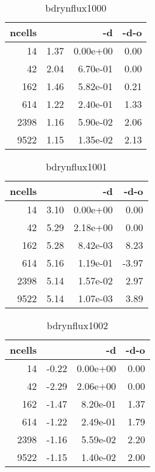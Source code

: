 \documentclass[11pt]{article}
\begin{document}
%
%
\begin{table}[!htbp]
\begin{center}
\begin{tabular}{r||r|r|r}
ncells           &                  & -d               & -d-o            \\\hline\hline
             14&      1.37&  0.00e+00&    0.00\\\hline
             42&      2.04&  6.70e-01&    0.00\\\hline
            162&      1.46&  5.82e-01&    0.21\\\hline
            614&      1.22&  2.40e-01&    1.33\\\hline
           2398&      1.16&  5.90e-02&    2.06\\\hline
           9522&      1.15&  1.35e-02&    2.13\\\hline
\end{tabular}
\caption{bdrynflux1000}
\end{center}
\label{tab:bdrynflux1000}
\end{table}
%
%
\begin{table}[!htbp]
\begin{center}
\begin{tabular}{r||r|r|r}
ncells           &                  & -d               & -d-o            \\\hline\hline
             14&      3.10&  0.00e+00&    0.00\\\hline
             42&      5.29&  2.18e+00&    0.00\\\hline
            162&      5.28&  8.42e-03&    8.23\\\hline
            614&      5.16&  1.19e-01&   -3.97\\\hline
           2398&      5.14&  1.57e-02&    2.97\\\hline
           9522&      5.14&  1.07e-03&    3.89\\\hline
\end{tabular}
\caption{bdrynflux1001}
\end{center}
\label{tab:bdrynflux1001}
\end{table}
%
%
\begin{table}[!htbp]
\begin{center}
\begin{tabular}{r||r|r|r}
ncells           &                  & -d               & -d-o            \\\hline\hline
             14&     -0.22&  0.00e+00&    0.00\\\hline
             42&     -2.29&  2.06e+00&    0.00\\\hline
            162&     -1.47&  8.20e-01&    1.37\\\hline
            614&     -1.22&  2.49e-01&    1.79\\\hline
           2398&     -1.16&  5.59e-02&    2.20\\\hline
           9522&     -1.15&  1.40e-02&    2.00\\\hline
\end{tabular}
\caption{bdrynflux1002}
\end{center}
\label{tab:bdrynflux1002}
\end{table}
\end{document}
